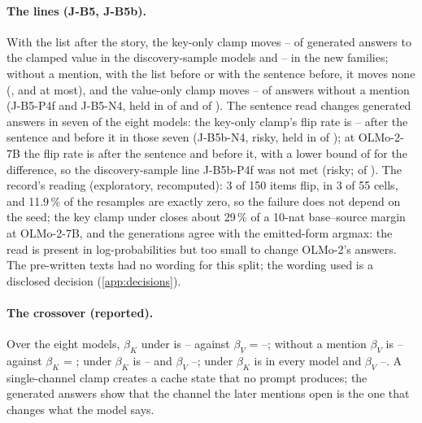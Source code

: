 \paragraph{The lines (J-B5, J-B5b).} With the list after the story, the key-only clamp moves \JbRangeBetaKAfterPfourMin{}--\JbRangeBetaKAfterPfourMax{} of generated answers to the clamped value in the discovery-sample models and \JbRangeBetaKAfterNfourMin{}--\JbRangeBetaKAfterNfourMax{} in the new families; without a mention, with the list before or with the sentence before, it moves none (\JbRangeBetaKNoneEightMax{}, \JbRangeBetaKBeforeEightMax{} and \JbRangeBetaKPreEightMax{} at most), and the value-only clamp moves \JbRangeBetaVNoneEightMin{}--\JbRangeBetaVNoneEightMax{} of answers without a mention (J-B5-P4f and J-B5-N4, held in \JbFivePfMet{} of \JbFivePfEval{} and \JbFiveNfMet{} of \JbFiveNfEval{}). The sentence read changes generated answers in seven of the eight models: the key-only clamp's flip rate is \JbFivebFlipPostMetMin{}--\JbFivebFlipPostMetMax{} after the sentence and \JbRangeFlipPreEightMax{} before it in those seven (J-B5b-N4, risky, held in \JbFivebNfMet{} of \JbFivebNfEval{}); at OLMo-2-7B the flip rate is \JbFivebFlipPostOlmoSeven{} after the sentence and \JbFivebFlipPreOlmoSeven{} before it, with a lower bound of \JbFivebLbOlmoSeven{} for the difference, so the discovery-sample line J-B5b-P4f was not met (risky; \JbFivebPfMet{} of \JbFivebPfEval{}). The record's reading (exploratory, recomputed): 3 of 150 items flip, in 3 of 55 cells, and 11.9\,\% of the resamples are exactly zero, so the failure does not depend on the seed; the key clamp under \fmtPost{} closes about 29\,\% of a 10-nat base--source margin at OLMo-2-7B, and the generations agree with the emitted-form argmax: the read is present in log-probabilities but too small to change OLMo-2's answers. The pre-written texts had no wording for this split; the wording used is a disclosed decision (\cref{app:decisions}). %

\paragraph{The crossover (reported).} Over the eight models, $\beta_K$ under \fmtListA{} is \JbRangeBetaKAfterEightMin{}--\JbRangeBetaKAfterEightMax{} against $\beta_V$ = \JbRangeBetaVAfterEightMin{}--\JbRangeBetaVAfterEightMax{}; without a mention $\beta_V$ is \JbRangeBetaVNoneEightMin{}--\JbRangeBetaVNoneEightMax{} against $\beta_K$ = \JbRangeBetaKNoneEightMax{}; under \fmtPost{} $\beta_K$ is \JbRangeBetaKPostEightMin{}--\JbRangeBetaKPostEightMax{} and $\beta_V$ \JbRangeBetaVPostEightMin{}--\JbRangeBetaVPostEightMax{}; under \fmtNull{} $\beta_K$ is \JbRangeBetaKPostNullEightMax{} in every model and $\beta_V$ \JbRangeBetaVPostNullEightMin{}--\JbRangeBetaVPostNullEightMax{}. A single-channel clamp creates a cache state that no prompt produces; the generated answers show that the channel the later mentions open is the one that changes what the model says.

